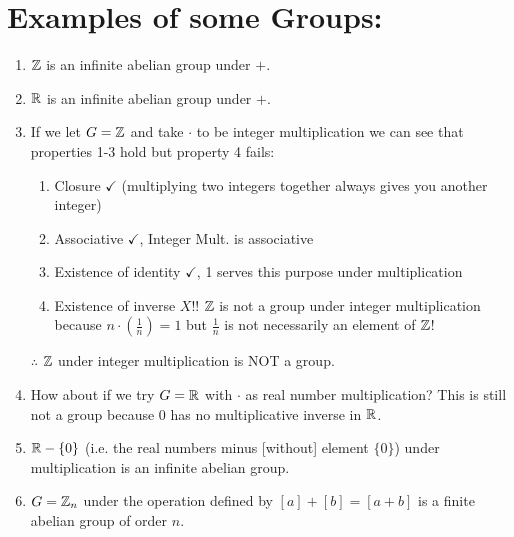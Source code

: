 \section{Examples of some Groups:} 
\begin{enumerate}
    \item ${\mathbb{ Z}}$ is an infinite abelian group under $+$.
    \item ${\mathbb{ R}}$ is an infinite abelian group under $+$.
    \item If we let $G={\mathbb{ Z}}$ and take $\cdot$ to be integer multiplication we can see that properties 1-3 hold but property 4 fails:
    \begin{enumerate}[label=\roman*]
        \item Closure $\checkmark$ (multiplying two integers together always gives you another integer)
        \item Associative $\checkmark$, Integer Mult. is associative
        \item Existence of identity $\checkmark$, 1 serves this purpose under multiplication
        \item Existence of inverse $X$!! ${\mathbb{ Z}}$ is not a group under integer multiplication because $n\cdot (\frac{1}{n})=1$ but $\frac{1}{n}$ is not necessarily an element of ${\mathbb{ Z}}$!
    \end{enumerate}
    $\therefore$ ${\mathbb{ Z}}$ under integer multiplication is NOT a group.
    \item How about if we try $G={\mathbb{ R}}$ with $\cdot$ as real number multiplication? This is still not a group because 0 has no multiplicative inverse in ${\mathbb{ R}}$. 
    \item ${\mathbb{ R}}-\{0\}$ (i.e. the real numbers minus [without] element $\{0\}$) under multiplication is an infinite abelian group.
    \item $G={\mathbb{ Z}}_n$ under the operation defined by $[a]+[b]=[a+b]$ is a finite abelian group of order $n$.
\end{enumerate}
